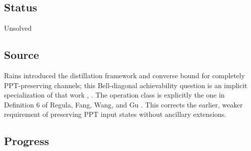 \subsection*{Status}

Unsolved

\subsection*{Source}

Rains introduced the distillation framework and converse bound for
completely PPT-preserving channels; this Bell-diagonal achievability question
is an implicit specialization of that work
,
.
The operation class is explicitly the one in Definition 6 of
Regula, Fang, Wang, and Gu .
This corrects the earlier, weaker requirement of preserving PPT input
states without ancillary extensions.

\subsection*{Progress}


